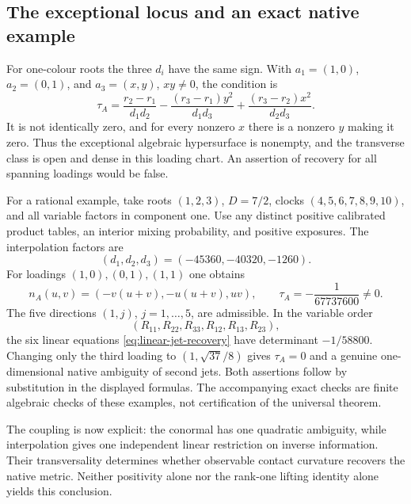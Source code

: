 \subsection{The exceptional locus and an exact native example}
For one-colour roots the three $d_i$ have the same sign. With
$a_1=(1,0)$, $a_2=(0,1)$, and $a_3=(x,y)$, $xy\ne0$, the condition is
\[
 \tau_A=\frac{r_2-r_1}{d_1d_2}
       -\frac{(r_3-r_1)y^2}{d_1d_3}
       +\frac{(r_3-r_2)x^2}{d_2d_3}.
\]
It is not identically zero, and for every nonzero $x$ there is a nonzero $y$ making it zero. Thus the exceptional algebraic hypersurface is nonempty, and the transverse class is open and dense in this loading chart. An assertion of recovery for all spanning loadings would be false.

For a rational example, take roots $(1,2,3)$, $D=7/2$, clocks $(4,5,6,7,8,9,10)$, and all variable factors in component one. Use any distinct positive calibrated product tables, an interior mixing probability, and positive exposures. The interpolation factors are
\[
 (d_1,d_2,d_3)=(-45360,-40320,-1260).
\]
For loadings $(1,0),(0,1),(1,1)$ one obtains
\[
 n_A(u,v)=(-v(u+v),-u(u+v),uv),\qquad
 \tau_A=-\frac1{67737600}\ne0.
\]
The five directions $(1,j)$, $j=1,\ldots,5$, are admissible. In the variable order
\[ (R_{11},R_{22},R_{33},R_{12},R_{13},R_{23}), \]
the six linear equations \eqref{eq:linear-jet-recovery} have determinant $-1/58800$. Changing only the third loading to $(1,\sqrt{37}/8)$ gives $\tau_A=0$ and a genuine one-dimensional native ambiguity of second jets. Both assertions follow by substitution in the displayed formulas. The accompanying exact checks are finite algebraic checks of these examples, not certification of the universal theorem.

The coupling is now explicit: the conormal has one quadratic ambiguity, while interpolation gives one independent linear restriction on inverse information. Their transversality determines whether observable contact curvature recovers the native metric. Neither positivity alone nor the rank-one lifting identity alone yields this conclusion.
